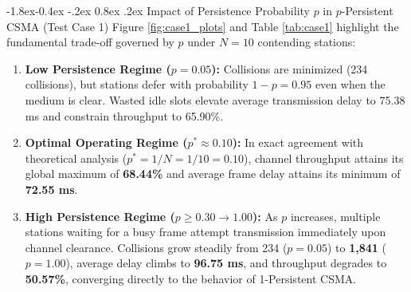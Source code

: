 \documentclass[11pt,a4paper]{article}
\makeatletter
\renewcommand\subsection{\@startsection{subsection}{2}{\z@}%
                                     {-1.8ex\@plus -0.4ex \@minus -.2ex}%
                                     {0.8ex \@plus .2ex}%
                                     {\normalfont\large\bfseries}}
\makeatother
\begin{document}
\subsection{Impact of Persistence Probability \texorpdfstring{$p$}{p} in \texorpdfstring{$p$-Persistent}{p-Persistent} CSMA (Test Case 1)}
Figure \ref{fig:case1_plots} and Table \ref{tab:case1} highlight the fundamental trade-off governed by $p$ under $N = 10$ contending stations:
\begin{enumerate}
    \item \textbf{Low Persistence Regime ($p = 0.05$):} Collisions are minimized (234 collisions), but stations defer with probability $1-p = 0.95$ even when the medium is clear. Wasted idle slots elevate average transmission delay to 75.38 ms and constrain throughput to 65.90\%.
    \item \textbf{Optimal Operating Regime ($p^* \approx 0.10$):} In exact agreement with theoretical analysis ($p^* = 1/N = 1/10 = 0.10$), channel throughput attains its global maximum of \textbf{68.44\%} and average frame delay attains its minimum of \textbf{72.55 ms}.
    \item \textbf{High Persistence Regime ($p \ge 0.30 \to 1.00$):} As $p$ increases, multiple stations waiting for a busy frame attempt transmission immediately upon channel clearance. Collisions grow steadily from 234 ($p=0.05$) to \textbf{1,841} ($p=1.00$), average delay climbs to \textbf{96.75 ms}, and throughput degrades to \textbf{50.57\%}, converging directly to the behavior of 1-Persistent CSMA.
\end{enumerate}
\end{document}
